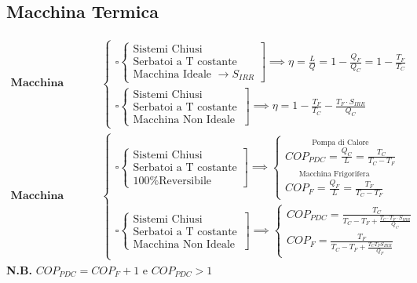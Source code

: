 \documentclass[a4paper]{report}
\begin{document}
\subsection*{Macchina Termica}
\begin{align*}
    \textbf{Macchina Motrice:} &\left\{\begin{array}{l}
        \square\left\{\begin{array}{l}
            \text{Sistemi Chiusi}\\
            \text{Serbatoi a T costante}\\
            \text{Macchina Ideale }\rightarrow S_{IRR}
        \end{array}\right]\implies\boxed{\eta=\frac{L}{Q}}=\boxed{1-\frac{Q_F}{Q_C}}=\boxed{1-\frac{T_F}{T_C}}\\
        \square\left\{\begin{array}{l}
            \text{Sistemi Chiusi}\\
            \text{Serbatoi a T costante}\\
            \text{Macchina Non Ideale }
        \end{array}\right]\implies \boxed{\eta = 1-\frac{T_F}{T_C}-\frac{T_F\cdot S_{IRR}}{Q_C}}
    \end{array}\right.\\
    \textbf{Macchina Operatrice}&\left\{\begin{array}{l}
        \square\left\{\begin{array}{l}
            \text{Sistemi Chiusi}\\
            \text{Serbatoi a T costante}\\
            \text{100\% Reversibile }
        \end{array}\right]\implies\left\{\begin{array}{l}
            \overset{\text{Pompa di Calore}}{\boxed{COP_{PDC}=\frac{Q_C}{L}=\frac{T_C}{T_C-T_F}}}\\
            \overset{\text{Macchina Frigorifera}}{\boxed{COP_F=\frac{Q_F}{L}=\frac{T_F}{T_C-T_F}}}
        \end{array}\right.\\
        \square\left\{\begin{array}{l}
            \text{Sistemi Chiusi}\\
            \text{Serbatoi a T costante}\\
            \text{Macchina Non Ideale }
        \end{array}\right]\implies \left\{\begin{array}{l}
            \boxed{COP_{PDC}=\frac{T_C}{T_C-T_F+\frac{T_C\cdot T_F \cdot S_{IRR}}{Q_C}}}\\
            \boxed{COP_F = \frac{T_F}{T_C-T_F+\frac{T_CT_FS_{IRR}}{Q_F}}}
        \end{array}\right.
    \end{array}\right.
\end{align*}
\textbf{N.B.} $\boxed{COP_{PDC}=COP_F+1}$ e $\boxed{COP_{PDC}>1}$
\end{document}
